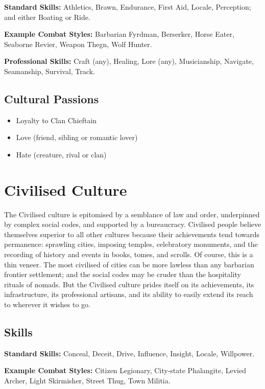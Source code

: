 \documentclass[10pt]{article}
\begin{document}
\textbf{Standard Skills:} Athletics, Brawn, Endurance, First Aid, Locale, Perception; and either Boating or Ride.

\textbf{Example Combat Styles:} Barbarian Fyrdman, Berserker, Horse Eater, Seaborne Revier, Weapon Thegn, Wolf Hunter.

\textbf{Professional Skills:} Craft (any), Healing, Lore (any), Musicianship, Navigate, Seamanship, Survival, Track.

\subsection{Cultural Passions}
\label{sec:barbarian-passions}

\begin{itemize}
    \item Loyalty to Clan Chieftain
    \item Love (friend, sibling or romantic lover)
    \item Hate (creature, rival or clan)
\end{itemize}

\section{Civilised Culture}
\label{sec:civilised}

The Civilised culture is epitomised by a semblance of law and order, underpinned by complex social codes, and supported by a bureaucracy. Civilised people believe themselves superior to all other cultures because their achievements tend towards permanence: sprawling cities, imposing temples, celebratory monuments, and the recording of history and events in books, tomes, and scrolls. Of course, this is a thin veneer. The most civilised of cities can be more lawless than any barbarian frontier settlement; and the social codes may be cruder than the hospitality rituals of nomads. But the Civilised culture prides itself on its achievements, its infrastructure, its professional artisans, and its ability to easily extend its reach to wherever it wishes to go.


\subsection{Skills}
\label{sec:civilised-skills}

\textbf{Standard Skills:} Conceal, Deceit, Drive, Influence, Insight, Locale, Willpower.

\textbf{Example Combat Styles:} Citizen Legionary, City-state Phalangite, Levied Archer, Light Skirmisher, Street Thug, Town Militia.
\end{document}
